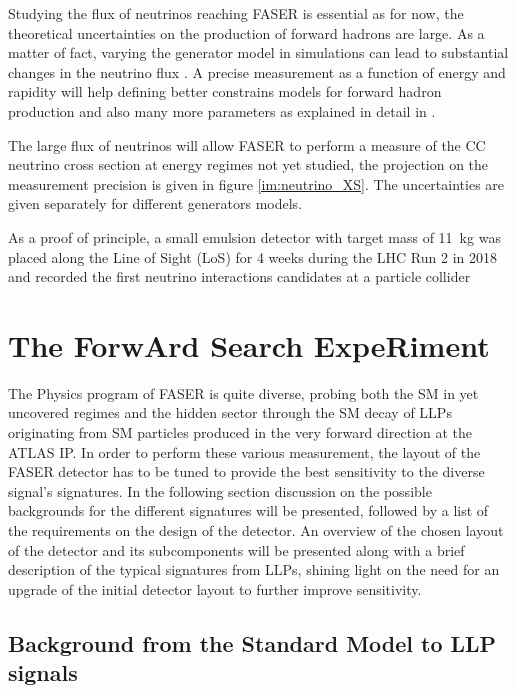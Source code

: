 		Studying the flux of neutrinos reaching FASER is essential as for now, the theoretical uncertainties on the production of forward hadrons are large. As a matter of fact, varying the generator model in simulations can lead to substantial changes in the neutrino flux \cite{FASER_Detector}. A precise measurement as a function of energy and rapidity will help defining better constrains models for forward hadron production and also many more parameters as explained in detail in \cite{FASER_Detector}.  
		
		The large flux of neutrinos will allow FASER to perform a measure of the CC neutrino cross section at energy regimes not yet studied, the projection on the measurement precision is given in figure \ref{im:neutrino_XS}. The uncertainties are given separately for different generators models. 
		
		As a proof of principle, a small emulsion detector with target mass of \SI{11}{\kilo\gram} was placed along the Line of Sight (LoS) for 4 weeks during the LHC Run 2 in 2018 and recorded the first neutrino interactions candidates at a particle collider \cite{neutrino_pop}
	\clearpage
	
	
	
	\section{The ForwArd Search ExpeRiment}
	 The Physics program of FASER is quite diverse, probing both the SM in yet uncovered regimes and the hidden sector through the SM decay of LLPs originating from SM particles produced in the very forward direction at the ATLAS IP. In order to perform these various measurement, the layout of the FASER detector has to be tuned to provide the best sensitivity to the diverse signal's signatures. 
	 In the following section discussion on the possible backgrounds for the different signatures will be presented, followed by a list of the requirements on the design of the detector. An overview of the chosen layout of the detector and its subcomponents will be presented along with a brief description of the typical signatures from LLPs, shining light on the need for an upgrade of the initial detector layout to further improve sensitivity.   
	
		\subsection{Background from the Standard Model to LLP signals}
	
